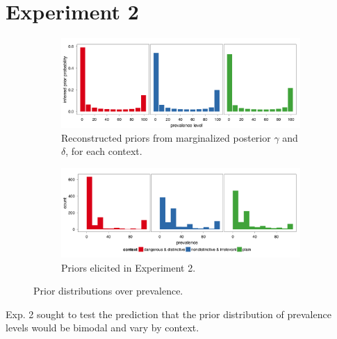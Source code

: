 \documentclass[10pt,letterpaper]{article}
\begin{document}
\section{Experiment 2}

\begin{figure}
        \centering
        \begin{subfigure}[b]{\columnwidth}
    			\includegraphics[width=\columnwidth]{inferred_marginalized_priors}
                \caption{Reconstructed priors from marginalized posterior $\gamma$ and $\delta$, for each context.}
                \label{fig:inferredpriors}
        \end{subfigure}%
        
        
        \begin{subfigure}[b]{\columnwidth}
                \includegraphics[width=\columnwidth]{elicited_priors}
                \caption{Priors elicited in Experiment 2.}
                \label{fig:elicitedpriors}
        \end{subfigure}
        \caption{Prior distributions over prevalence.}\label{fig:priors}
\end{figure}


Exp. 2 sought to test the prediction that the prior distribution of prevalence levels would be bimodal and vary by context.
\end{document}
